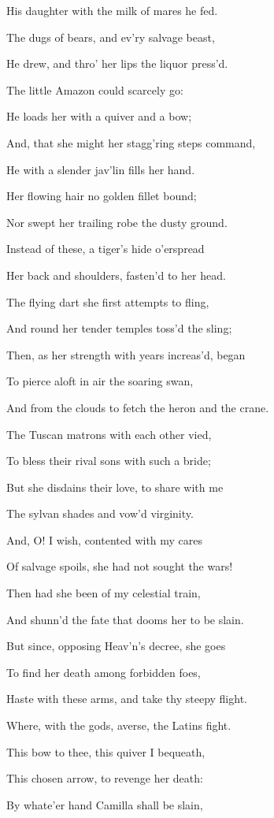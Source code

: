 His daughter with the milk of mares he fed.

The dugs of bears, and ev’ry salvage beast,

He drew, and thro’ her lips the liquor press’d.

The little Amazon could scarcely go:

He loads her with a quiver and a bow;

And, that she might her stagg’ring steps command,

He with a slender jav’lin fills her hand.

Her flowing hair no golden fillet bound;

Nor swept her trailing robe the dusty ground.

Instead of these, a tiger’s hide o’erspread

Her back and shoulders, fasten’d to her head.

The flying dart she first attempts to fling,

And round her tender temples toss’d the sling;

Then, as her strength with years increas’d, began

To pierce aloft in air the soaring swan,

And from the clouds to fetch the heron and the crane.

The Tuscan matrons with each other vied,

To bless their rival sons with such a bride;

But she disdains their love, to share with me

The sylvan shades and vow’d virginity.

And, O! I wish, contented with my cares

Of salvage spoils, she had not sought the wars!

Then had she been of my celestial train,

And shunn’d the fate that dooms her to be slain.

But since, opposing Heav’n’s decree, she goes

To find her death among forbidden foes,

Haste with these arms, and take thy steepy flight.

Where, with the gods, averse, the Latins fight.

This bow to thee, this quiver I bequeath,

This chosen arrow, to revenge her death:

By whate’er hand Camilla shall be slain,

